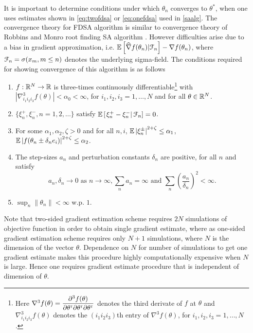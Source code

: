 It is important to determine conditions under which $\theta_n$ converges to $\theta^*$, when one uses estimates shown in \eqref{eq:twofdsa} or \eqref{eq:onefdsa} used in \eqref{saalg}. The convergence theory for FDSA algorithm is similar to convergence theory of Robbins and Monro root finding SA algorithm \cite{rm}. However difficulties arise due to a bias in gradient approximation, i.e. $\mathbb{E} \left[\widehat{\nabla} f(\theta_{n})|\mathcal{F}_n \right] - \nabla f(\theta_{n}) $, where $\mathcal{F}_n = \sigma(x_m, m\le n)$ denotes the underlying sigma-field. The conditions required for showing convergence of this algorithm is as follows
\begin{enumerate}[label=(\textbf{A\arabic*})]
\item $f:\mathbb{R}^N\rightarrow \mathbb{R}$ is three-times continuously differentiable\footnote{Here $\nabla^3 f(\theta) = \dfrac{\partial^3 f (\theta)}{\partial \theta^\mathsf{\scriptscriptstyle T} \partial \theta^\mathsf{\scriptscriptstyle T} \partial \theta^\mathsf{\scriptscriptstyle T}}$ denotes the third derivate of $f$ at $\theta$ and $\nabla^3_{i_1 i_2 i_3} f(\theta)$ denotes the $(i_1 i_2 i_3)$th entry of $\nabla^3 f(\theta)$, for $i_1, i_2, i_3=1,\ldots, N$.}  with $\left|\nabla^3_{i_1 i_2 i_3} f(\theta) \right| < \alpha_0 < \infty$, for $i_1, i_2, i_3=1,\ldots, N$ and for all $\theta\in \mathbb{R}^N$. 
\item $\{\xi_n^+,\xi_n^-, n=1,2,\ldots\}$ satisfy $\mathbb{E}\left[\left.\xi_n^+ - \xi_n^- \right| \mathcal{F}_n\right] = 0$.
\item For some $\alpha_1, \alpha_2, \zeta >0$ and for all $n,i$, 
$\mathbb{E} \left|\xi_n^{\pm}\right|^{2+\zeta} \le \alpha_1$, $\mathbb{E} \left|f(\theta_n\pm \delta_n e_i)\right|^{2+\zeta} \le \alpha_2$. 
\item The step-sizes $a_n$ and perturbation constants $\delta_n$ are positive, for all $n$ and satisfy
$$a_n, \delta_n \rightarrow 0\text{ as } n \rightarrow \infty, 
\sum_n a_n=\infty \text{ and } \sum_n \left(\frac{a_n}{\delta_n}\right)^2 <\infty.$$
\item $\sup_n \left\| \theta_n \right\| < \infty$ w.p. $1$.
\end{enumerate}
Note that two-sided gradient estimation scheme requires $2N$ simulations of objective function in order to obtain single gradient estimate, where as one-sided gradient estimation scheme requires only $N+1$ simulations, where $N$ is the dimension of the vector $\theta$. Dependence on $N$ for number of simulations to get one gradient estimate makes this procedure highly computationally expensive when $N$ is large. Hence one requires gradient estimate procedure that is independent of dimension of $\theta$.
